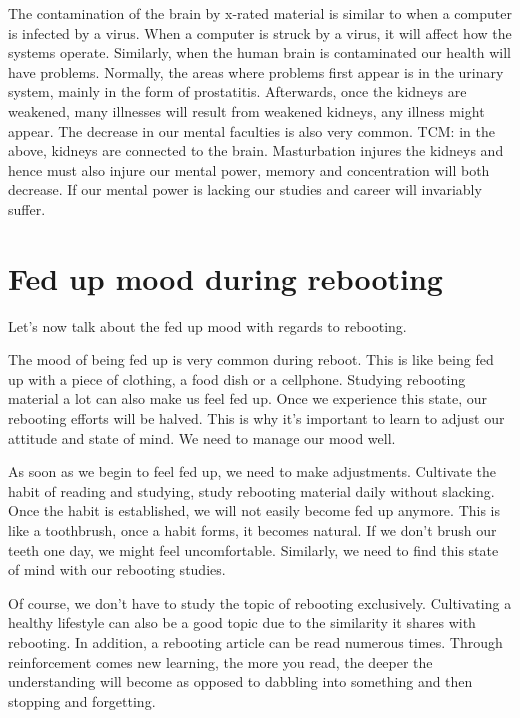 \documentclass[
]{book}
\begin{document}
The contamination of the brain by x-rated material is similar to when a computer is infected by a virus. When a computer is struck by a virus, it will affect how the systems operate. Similarly, when the human brain is contaminated our health will have problems. Normally, the areas where problems first appear is in the urinary system, mainly in the form of prostatitis. Afterwards, once the kidneys are weakened, many illnesses will result from weakened kidneys, any illness might appear. The decrease in our mental faculties is also very common. TCM: in the above, kidneys are connected to the brain. Masturbation injures the kidneys and hence must also injure our mental power, memory and concentration will both decrease. If our mental power is lacking our studies and career will invariably suffer.

\hypertarget{fed-up-mood-during-rebooting}{%
\section{Fed up mood during rebooting}\label{fed-up-mood-during-rebooting}}

Let's now talk about the fed up mood with regards to rebooting.

The mood of being fed up is very common during reboot. This is like being fed up with a piece of clothing, a food dish or a cellphone. Studying rebooting material a lot can also make us feel fed up. Once we experience this state, our rebooting efforts will be halved. This is why it's important to learn to adjust our attitude and state of mind. We need to manage our mood well.

As soon as we begin to feel fed up, we need to make adjustments. Cultivate the habit of reading and studying, study rebooting material daily without slacking. Once the habit is established, we will not easily become fed up anymore. This is like a toothbrush, once a habit forms, it becomes natural. If we don't brush our teeth one day, we might feel uncomfortable. Similarly, we need to find this state of mind with our rebooting studies.

Of course, we don't have to study the topic of rebooting exclusively. Cultivating a healthy lifestyle can also be a good topic due to the similarity it shares with rebooting. In addition, a rebooting article can be read numerous times. Through reinforcement comes new learning, the more you read, the deeper the understanding will become as opposed to dabbling into something and then stopping and forgetting.
\end{document}
